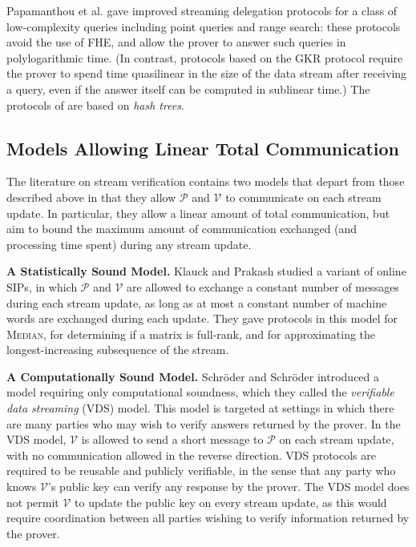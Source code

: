 \documentclass[11pt, letterpaper]{article}
\newcommand{\cV}{\mathcal{V}}
\newcommand{\cP}{\mathcal{P}}
\begin{document}
 Papamanthou et al. \cite{eurocryptpaper} gave
improved streaming delegation protocols for a class of low-complexity queries including point queries and range search: these
protocols avoid the use of FHE, and allow the prover to answer such queries in polylogarithmic time. 
(In contrast, protocols based on the GKR protocol \cite{chung, vldb} require the prover to spend time 
quasilinear in the size of the data stream after receiving
a query, even if the answer itself can be computed in sublinear time.) The protocols of \cite{eurocryptpaper} are based on \emph{hash trees}.


\subsection{Models Allowing Linear Total Communication}
\label{sec:perupdate}
The literature on stream verification contains two models that depart from those described above in that they allow $\cP$ and $\cV$ to communicate on each stream update. In particular, they allow a linear amount of total communication, but aim to bound the maximum amount of communication exchanged (and processing time spent) during any stream update.

\medskip
\noindent \textbf{A Statistically Sound Model.} 
Klauck and Prakash \cite{prakash} studied a variant of online SIPs, in which $\cP$ and $\cV$ are allowed to exchange a constant number of messages during each stream update, as long as at most a constant number of machine words are exchanged during each update. They gave protocols in this model for \textsc{Median}, for determining if a matrix is full-rank, and for approximating the longest-increasing subsequence of the stream.

\medskip
\noindent \textbf{A Computationally Sound Model.} Schr{\"o}der and Schr{\"o}der \cite{ccs} introduced a model requiring only computational soundness, which they called the \emph{verifiable data streaming} (VDS) model. This model is targeted at settings in which there are many parties who may wish to verify answers returned by the prover. In the VDS model, $\cV$ is allowed to send a short message to $\cP$ on each stream update, with no communication allowed in the reverse direction. VDS protocols are required to be reusable and publicly verifiable, in the sense that any party who knows $\cV$'s public key can verify any response by the prover. The VDS model does not permit $\cV$ to update the public key on every stream update, as this would require coordination between all parties wishing to verify information returned by the prover. 
\end{document}
